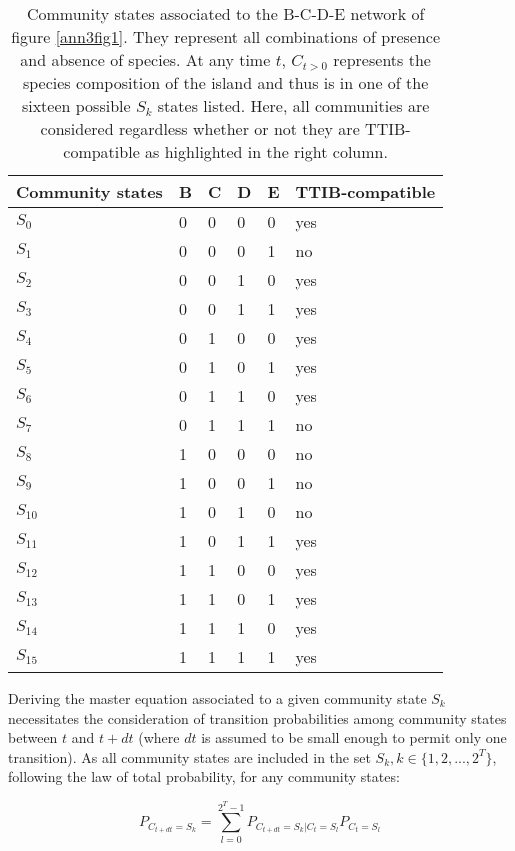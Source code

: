\begin{table}[]
\centering
\caption[Community states associated to simple networks]{Community states
associated to the B-C-D-E network of figure \ref{ann3fig1}. They represent
all combinations of presence and absence of species. At any time
\(t\), \(C_{t>0}\) represents the species composition of the island and
thus is in one of the sixteen possible \(S_k\) states listed. Here, all
communities are considered regardless whether or not they are TTIB-compatible
as highlighted in the right column.}
\label{tabAnnIII_1}
  \begin{tabular}{|l|l|l|l|l|l|}
    Community states & B & C & D & E & TTIB-compatible \\ \hline
    \(S_{0}\) & 0 & 0 & 0 & 0 & yes \\
    \(S_{1}\) & 0 & 0 & 0 & 1 & no \\
    \(S_{2}\) & 0 & 0 & 1 & 0 & yes \\
    \(S_{3}\) & 0 & 0 & 1 & 1 & yes \\
    \(S_{4}\) & 0 & 1 & 0 & 0 & yes \\
    \(S_{5}\) & 0 & 1 & 0 & 1 & yes \\
    \(S_{6}\) & 0 & 1 & 1 & 0 & yes \\
    \(S_{7}\) & 0 & 1 & 1 & 1 & no \\
    \(S_{8}\) & 1 & 0 & 0 & 0 & no \\
    \(S_{9}\) & 1 & 0 & 0 & 1 & no \\
    \(S_{10}\) & 1 & 0 & 1 & 0 & no \\
    \(S_{11}\) & 1 & 0 & 1 & 1 & yes \\
    \(S_{12}\) & 1 & 1 & 0 & 0 & yes \\
    \(S_{13}\) & 1 & 1 & 0 & 1 & yes \\
    \(S_{14}\) & 1 & 1 & 1 & 0 & yes \\
    \(S_{15}\) & 1 & 1 & 1 & 1 & yes
  \end{tabular}
\end{table}


Deriving the master equation associated to a given community state
\(S_k\) necessitates the consideration of transition probabilities among community
states between \(t\) and \(t+dt\) (where \(dt\) is assumed to be small enough
to permit only one transition). As all community states are included
in the set \(S_k, k\in\{1,2,...,2^T\}\), following the law of total
probability, for any community states:

\begin{equation}
P_{C_{t+dt}=S_{k}}= \sum_{l=0}^{2^T-1} P_{C_{t+dt}=S_k|C_{t}=S_l}P_{C_{t}=S_l}
\end{equation}


